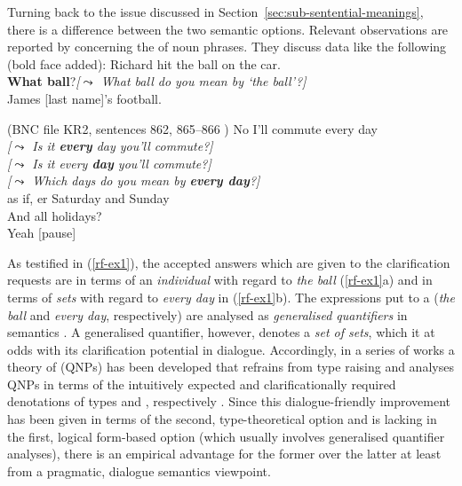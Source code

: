\documentclass[output=paper]{langsci/langscibook}
\begin{document}
{Turning back to the issue discussed in Section~\ref{sec:sub-sentential-meanings}, there is a difference between the two semantic options.
%
Relevant observations are reported by \citet{Purver:Ginzburg:2004} concerning the  of noun phrases.
%
They discuss data like the following (bold face added):
%
\ea \label{rf-ex1}
  \ea  {} Richard hit the ball on the car. \\
 \textbf{What ball}?\hspace*{0.25cm}\emph{[$\leadsto$ What ball do you mean by  `the ball'?]} \\
 James [last name]'s football. \par\smallskip
\hfill (BNC file KR2, sentences 862, 865--866 )
  \ex {} No I'll commute every day \\
 \emph{[$\leadsto$ Is it \textbf{every} day you'll commute?]}\\
 \emph{[$\leadsto$ Is it every \textbf{day} you'll commute?]}\\
 \emph{[$\leadsto$ Which days do you mean by \textbf{every day}?]}\\
 as if, er Saturday and Sunday \\
 And all holidays? \\
 Yeah [pause]
  \z
\z

As testified in (\ref{rf-ex1}), the accepted answers which are given to the clarification requests are in terms of an \emph{individual} with regard to \textit{the ball} (\ref{rf-ex1}a) and in terms of \emph{sets} with regard to \textit{every day} in (\ref{rf-ex1}b).
%
The expressions put to a  (\textit{the ball} and \textit{every day}, respectively) are analysed as \emph{generalised quantifiers}  in semantics \citep{montague73}.
%
A generalised quantifier, however, denotes a \emph{set of sets}, which it at odds with its clarification potential in dialogue. 
%
Accordingly, in a series of works a theory of  (QNPs) has been developed that refrains from type raising and analyses QNPs in terms of the intuitively expected and clarificationally required denotations of types  and , respectively  \citep{Purver:Ginzburg:2004,Ginzburg:Purver:2012,Ginzburg:2012,Cooper:2013,Luecking:Ginzburg:2018,Cooper:ms}. 
%
Since this dialogue-friendly improvement has been given in terms of the second, type-theoretical option and is lacking in the first, logical form-based option (which usually involves generalised quantifier analyses), there is an empirical advantage for the former over the latter at least from a pragmatic, dialogue semantics viewpoint.


}
\end{document}
